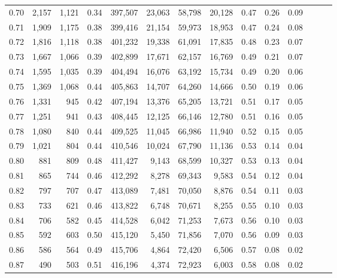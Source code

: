 \begin{tabular}{rrrrrrrrrrrrrr}
0.70 &   2,157 &  1,121 &  0.34 &  397,507 &   23,063 &  58,798 &  20,128 &  0.47 &  0.26 &      0.09 \\
0.71 &   1,909 &  1,175 &  0.38 &  399,416 &   21,154 &  59,973 &  18,953 &  0.47 &  0.24 &      0.08 \\
0.72 &   1,816 &  1,118 &  0.38 &  401,232 &   19,338 &  61,091 &  17,835 &  0.48 &  0.23 &      0.07 \\
0.73 &   1,667 &  1,066 &  0.39 &  402,899 &   17,671 &  62,157 &  16,769 &  0.49 &  0.21 &      0.07 \\
0.74 &   1,595 &  1,035 &  0.39 &  404,494 &   16,076 &  63,192 &  15,734 &  0.49 &  0.20 &      0.06 \\
0.75 &   1,369 &  1,068 &  0.44 &  405,863 &   14,707 &  64,260 &  14,666 &  0.50 &  0.19 &      0.06 \\
0.76 &   1,331 &    945 &  0.42 &  407,194 &   13,376 &  65,205 &  13,721 &  0.51 &  0.17 &      0.05 \\
0.77 &   1,251 &    941 &  0.43 &  408,445 &   12,125 &  66,146 &  12,780 &  0.51 &  0.16 &      0.05 \\
0.78 &   1,080 &    840 &  0.44 &  409,525 &   11,045 &  66,986 &  11,940 &  0.52 &  0.15 &      0.05 \\
0.79 &   1,021 &    804 &  0.44 &  410,546 &   10,024 &  67,790 &  11,136 &  0.53 &  0.14 &      0.04 \\
0.80 &     881 &    809 &  0.48 &  411,427 &    9,143 &  68,599 &  10,327 &  0.53 &  0.13 &      0.04 \\
0.81 &     865 &    744 &  0.46 &  412,292 &    8,278 &  69,343 &   9,583 &  0.54 &  0.12 &      0.04 \\
0.82 &     797 &    707 &  0.47 &  413,089 &    7,481 &  70,050 &   8,876 &  0.54 &  0.11 &      0.03 \\
0.83 &     733 &    621 &  0.46 &  413,822 &    6,748 &  70,671 &   8,255 &  0.55 &  0.10 &      0.03 \\
0.84 &     706 &    582 &  0.45 &  414,528 &    6,042 &  71,253 &   7,673 &  0.56 &  0.10 &      0.03 \\
0.85 &     592 &    603 &  0.50 &  415,120 &    5,450 &  71,856 &   7,070 &  0.56 &  0.09 &      0.03 \\
0.86 &     586 &    564 &  0.49 &  415,706 &    4,864 &  72,420 &   6,506 &  0.57 &  0.08 &      0.02 \\
0.87 &     490 &    503 &  0.51 &  416,196 &    4,374 &  72,923 &   6,003 &  0.58 &  0.08 &      0.02 \\

\end{tabular}
